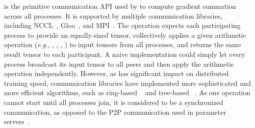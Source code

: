  is the primitive communication API used by  to compute gradient summation across all processes. It is supported by multiple communication libraries, including NCCL~\cite{nccl}, Gloo~\cite{gloo}, and MPI~\cite{mpi}. The  operation expects each participating process to provide an equally-sized tensor, collectively applies a given arithmetic operation (\emph{e.g.}, , , , ) to input tensors from all processes, and returns the same result tensor to each participant. A naive implementation could simply let every process broadcast its input tensor to all peers and then apply the arithmetic operation independently. However, as  has significant impact on distributed training speed, communication libraries have implemented more sophisticated and more efficient algorithms, such as ring-based ~\cite{nccl} and tree-based ~\cite{nccl:tree_reduce}. As one  operation cannot start until all processes join, it is considered to be a synchronized communication, as opposed to the P2P communication used in parameter servers~\cite{ps}.